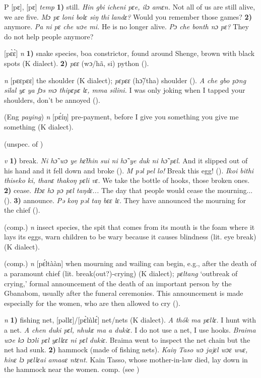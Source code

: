 \begin{letter}{P}
 [pɛ], [pɛ] \textit{temp} \textbf{1)} still. \textit{Hin gbi icheni pɛe, ilɔ amɛn.} Not all of us are still alive, we are five. \textit{Mɔ pɛ loni bolɛ siŋ thi landɛ?} Would you remember those games? \textbf{2)} anymore. \textit{Pa ni pɛ che wɔe mi.} He is no longer alive. \textit{Pɔ che bonth nɔ pɛ?} They do not help people anymore?

 [pɛ̀ɛ̀] \textit{n} \textbf{1)} snake species, boa constrictor, found around Shenge, brown with black spots (K dialect). \textbf{2)} \textit{pɛɛ} (wɔ/hã, si) python (\citealt{Pichl1967}).

 \textit{n} [pɛɛpɛɛ] the shoulder (K dialect); \textit{pɛpɛɛ} (hɔ̃/tha) shoulder (\citealt{Pichl1967}). \textit{A che gbo pɔng silal yɛ ya fɔs mɔ thipɛpɛ lɛ, mma silini.} I was only joking when I tapped your shoulders, don't be annoyed (\citealt{Pichl1967}).

 (Eng \textit{paying}) \textit{n} [pɛ́íŋ] pre-payment, before I give you something you give me something (K dialect). 

 (unspec. of ) 

 \textit{v} \textbf{1)} break. \textit{Ni hɔ̃ wɔ ye hɛ̃thin sui ni hɔ̃ ye duk ni hɔ̃ pɛl.} And it slipped out of his hand and it fell down and broke (\citealt{Pichl1967}). \textit{M pəl pel lo!} Break this egg! (\citealt{Pichl1967}). \textit{Ikoi bithi thiseko ki, thanɛ thakoŋ pɛli vɛ.} We take the bottle of hooks, those broken ones. \textbf{2)} cease. \textit{Hɔɛ hɔ pɔ pɛl taŋdɛ...} The day that people would cease the mourning... (\citealt{Sumner1921}). \textbf{3)} announce. \textit{Pə koŋ pəl taŋ bɛɛ lɛ.} They have announced the mourning for the chief (\citealt{Pichl1967}). 

 (comp.) \textit{n} insect species, the spit that comes from its mouth is the foam where it lays its eggs, warn children to be wary because it causes blindness (lit. eye break) (K dialect). 

 (comp.) \textit{n} [pɛ́ltààn] when mourning and wailing can begin, e.g., after the death of a paramount chief (lit. break(out?)-crying) (K dialect); \textit{pɛltang} ‘outbreak of crying,' formal announcement of the death of an important person by the Gbanabom, usually after the funeral ceremonies. This announcement is made especially for the women, who are then allowed to cry (\citealt{Pichl1967}). 

 \textit{n} \textbf{1)} fishing net, [pəllɛ]/[pɛ̀lǹlɛ́] net/nets (K dialect). \textit{A thók ma pɛllɛ.} I hunt with a net. \textit{A chen duki pɛl, nhukɛ ma a dukiɛ.} I do not use a net, I use hooks. \textit{Braima wɔe kɔ lɔɔli pɛl yɛllɛɛ ni pɛl dukiɛ.} Braima went to inspect the net chain but the net had sunk. \textbf{2)} hammock (made of fishing nets). \textit{Kaiŋ Taso wɔ jajɛl wɔɛ wuɛ, hinɛ lɔ pɛllɛai amaaɛ ntɛnt.} Kain Tasso, whose mother-in-law died, lay down in the hammock near the women. comp.  (see ) 


\end{letter}
